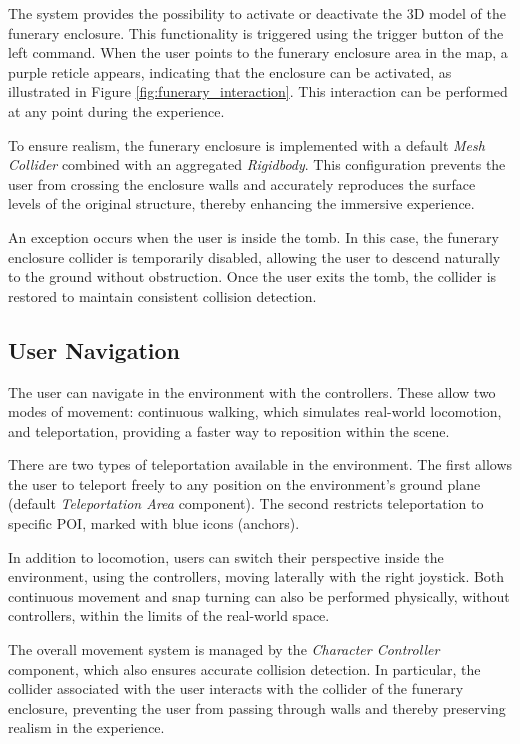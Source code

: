 The system provides the possibility to activate or deactivate the \gls{3D} model of the funerary enclosure.
This functionality is triggered using the trigger button of the left command. When the user points to the funerary enclosure area in the map, a purple reticle appears, indicating that the enclosure can be activated, as illustrated in Figure \ref{fig:funerary_interaction}. This interaction can be performed at any point during the experience.

To ensure realism, the funerary enclosure is implemented with a default \emph{Mesh Collider} combined with an aggregated \emph{Rigidbody}. This configuration prevents the user from crossing the enclosure walls and accurately reproduces the surface levels of the original structure, thereby enhancing the immersive experience.

An exception occurs when the user is inside the tomb. In this case, the funerary enclosure collider is temporarily disabled, allowing the user to descend naturally to the ground without obstruction. Once the user exits the tomb, the collider is restored to maintain consistent collision detection.

\subsection{User Navigation}
\label{sec:user_navigation}

The user can navigate in the environment with the controllers. 
These allow two modes of movement: continuous walking, which simulates real-world locomotion, and teleportation, providing a faster way to reposition within the scene.

There are two types of teleportation available in the environment. The first allows the user to teleport freely to any position on the environment’s ground plane (default \emph{Teleportation Area} component). The second restricts teleportation to specific \gls{POI}, marked with blue icons (anchors).

In addition to locomotion, users can switch their perspective inside the environment, using the controllers, moving laterally with the right joystick.
Both continuous movement and snap turning can also be performed physically, without controllers, within the limits of the real-world space.

The overall movement system is managed by the \emph{Character Controller} component, which also ensures accurate collision detection. In particular, the collider associated with the user interacts with the collider of the funerary enclosure, preventing the user from passing through walls and thereby preserving realism in the experience.

